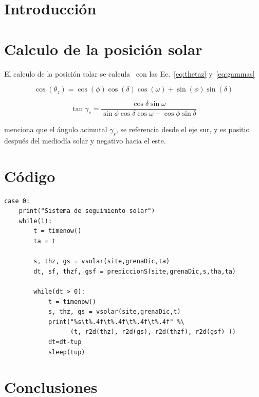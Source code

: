 \documentclass[spanish, letterpaper,12]{article}
\begin{document}
\renewcommand{\tablename}{Tabla}



\tableofcontents
\pagebreak

\section{Introducción}


\section{Calculo de la posición solar}

El calculo de la posición solar se calcula~\citep{Duffie2013solar} con las Ec.~\ref{eq:thetaz} y~\ref{eq:gammas}

\begin{equation}
  \label{eq:thetaz}
\cos(\theta_z) = \cos(\phi) \cos(\delta) \cos(\omega) + \sin(\phi) \sin(\delta)
\end{equation}

\begin{equation}
  \label{eq:gammas}
  \tan \gamma_s = \dfrac{ \cos \delta \sin \omega }{\sin \phi \cos \delta \cos \omega - \cos \phi \sin \delta}
\end{equation}


\citet{Duffie2013solar} menciona que el ángulo acimutal $\gamma_s$, se referencia desde el eje sur, y es positio después del mediodía solar y negativo hacia el este.


\section{Código}

\begin{lstlisting}[style=mypython, caption=Estracto del código main.py, label=lst:maincase0]
case 0:
    print("Sistema de seguimiento solar")
    while(1):
        t = timenow()
        ta = t

        s, thz, gs = vsolar(site,grenaDic,ta)
        dt, sf, thzf, gsf = prediccionS(site,grenaDic,s,tha,ta)

        while(dt > 0):
            t = timenow()
            s, thz, gs = vsolar(site,grenaDic,t)        
            print("%s\t%.4f\t%.4f\t%.4f\t%.4f" %\
                  (t, r2d(thz), r2d(gs), r2d(thzf), r2d(gsf) ))
            dt=dt-tup
            sleep(tup)
\end{lstlisting}


\section{Conclusiones}





\end{document}
